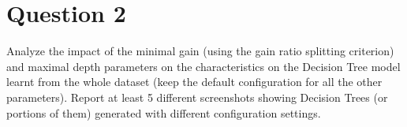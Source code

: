 \section{Question 2}

\begin{question}
    Analyze the impact of the minimal gain (using the gain ratio splitting criterion) and maximal depth
parameters on the characteristics on the Decision Tree model learnt from the whole dataset (keep
the default configuration for all the other parameters). Report at least 5 different screenshots
showing Decision Trees (or portions of them) generated with different configuration settings.
\end{question}


\begin{answer}
\end{answer}